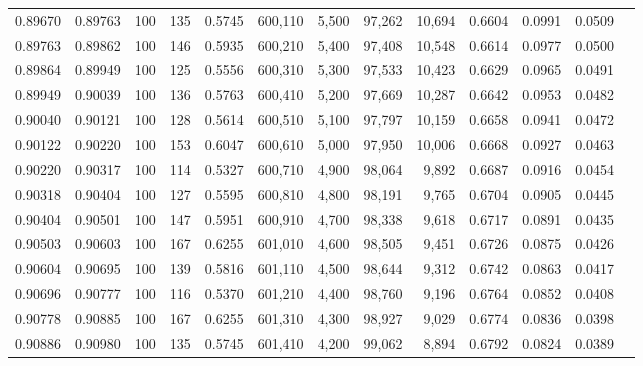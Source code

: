 \begin{tabular}{rrrrrrrrrrrrr}
0.89670 & 0.89763 &   100 & 135 &                                     0.5745 & 600,110 &   5,500 &  97,262 &  10,694 & 0.6604 & 0.0991 & 0.0509 \\
0.89763 & 0.89862 &   100 & 146 &                                     0.5935 & 600,210 &   5,400 &  97,408 &  10,548 & 0.6614 & 0.0977 & 0.0500 \\
0.89864 & 0.89949 &   100 & 125 &                                     0.5556 & 600,310 &   5,300 &  97,533 &  10,423 & 0.6629 & 0.0965 & 0.0491 \\
0.89949 & 0.90039 &   100 & 136 &                                     0.5763 & 600,410 &   5,200 &  97,669 &  10,287 & 0.6642 & 0.0953 & 0.0482 \\
0.90040 & 0.90121 &   100 & 128 &                                     0.5614 & 600,510 &   5,100 &  97,797 &  10,159 & 0.6658 & 0.0941 & 0.0472 \\
0.90122 & 0.90220 &   100 & 153 &                                     0.6047 & 600,610 &   5,000 &  97,950 &  10,006 & 0.6668 & 0.0927 & 0.0463 \\
0.90220 & 0.90317 &   100 & 114 &                                     0.5327 & 600,710 &   4,900 &  98,064 &   9,892 & 0.6687 & 0.0916 & 0.0454 \\
0.90318 & 0.90404 &   100 & 127 &                                     0.5595 & 600,810 &   4,800 &  98,191 &   9,765 & 0.6704 & 0.0905 & 0.0445 \\
0.90404 & 0.90501 &   100 & 147 &                                     0.5951 & 600,910 &   4,700 &  98,338 &   9,618 & 0.6717 & 0.0891 & 0.0435 \\
0.90503 & 0.90603 &   100 & 167 &                                     0.6255 & 601,010 &   4,600 &  98,505 &   9,451 & 0.6726 & 0.0875 & 0.0426 \\
0.90604 & 0.90695 &   100 & 139 &                                     0.5816 & 601,110 &   4,500 &  98,644 &   9,312 & 0.6742 & 0.0863 & 0.0417 \\
0.90696 & 0.90777 &   100 & 116 &                                     0.5370 & 601,210 &   4,400 &  98,760 &   9,196 & 0.6764 & 0.0852 & 0.0408 \\
0.90778 & 0.90885 &   100 & 167 &                                     0.6255 & 601,310 &   4,300 &  98,927 &   9,029 & 0.6774 & 0.0836 & 0.0398 \\
0.90886 & 0.90980 &   100 & 135 &                                     0.5745 & 601,410 &   4,200 &  99,062 &   8,894 & 0.6792 & 0.0824 & 0.0389 \\

\end{tabular}

